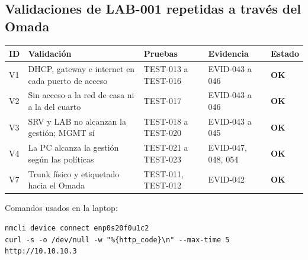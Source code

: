 \documentclass[11pt,a4paper]{article}
\newcommand{\estado}[1]{%
  \ifstrequal{#1}{COMPLETADA}{\textcolor{okgreen}{\textbf{\footnotesize #1}}}{%
  \ifstrequal{#1}{OPERATIVO VALIDADO}{\textcolor{okgreen}{\textbf{\footnotesize #1}}}{%
  \ifstrequal{#1}{OK}{\textcolor{okgreen}{\textbf{\footnotesize #1}}}{%
  \ifstrequal{#1}{RESUELTO}{\textcolor{okgreen}{\textbf{\footnotesize #1}}}{%
  \ifstrequal{#1}{EN CURSO}{\textcolor{amber}{\textbf{\footnotesize #1}}}{%
  \ifstrequal{#1}{REPORTADO}{\textcolor{amber}{\textbf{\footnotesize #1}}}{%
  \ifstrequal{#1}{NO EJECUTADA}{\textcolor{muted}{\textbf{\footnotesize #1}}}{%
  \ifstrequal{#1}{PROPUESTO}{\textcolor{violet}{\textbf{\footnotesize #1}}}{%
  \ifstrequal{#1}{PENDIENTE}{\textcolor{alertred}{\textbf{\footnotesize #1}}}{%
  \textbf{\footnotesize #1}}}}}}}}}}}
\newcommand{\cab}{\rowcolor{light}}
\begin{document}
\subsection{Validaciones de LAB-001 repetidas a través del Omada}
\begin{tabularx}{\textwidth}{L{1.0cm} Z L{3.4cm} L{2.6cm} L{1.4cm}}
  \toprule
  \cab\textbf{ID} & \textbf{Validación} & \textbf{Pruebas} & \textbf{Evidencia} & \textbf{Estado}\\
  \midrule
  V1 & DHCP, gateway e internet en cada puerto de acceso & TEST-013 a TEST-016 & EVID-043 a 046 & \estado{OK}\\
  V2 & Sin acceso a la red de casa ni a la del cuarto & TEST-017 & EVID-043 a 046 & \estado{OK}\\
  V3 & SRV y LAB no alcanzan la gestión; MGMT sí & TEST-018 a TEST-020 & EVID-043 a 045 & \estado{OK}\\
  V4 & La PC alcanza la gestión según las políticas & TEST-021 a TEST-023 & EVID-047, 048, 054 & \estado{OK}\\
  V7 & Trunk físico y etiquetado hacia el Omada & TEST-011, TEST-012 & EVID-042 & \estado{OK}\\
  \bottomrule
\end{tabularx}

Comandos usados en la laptop:
\begin{lstlisting}
nmcli device connect enp0s20f0u1c2
curl -s -o /dev/null -w "%{http_code}\n" --max-time 5 http://10.10.10.3
\end{lstlisting}
\end{document}
